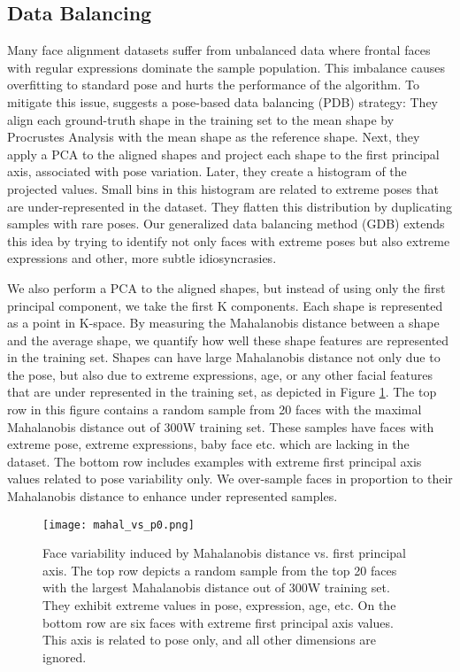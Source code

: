 \documentclass[9pt,twocolumn]{extarticle}
\begin{document}
\subsection{Data Balancing}

Many face alignment datasets suffer from unbalanced data where frontal faces with regular expressions dominate the sample population. This imbalance causes overfitting to standard pose and hurts the performance of the algorithm. To mitigate this issue,  \cite{feng2018wing} suggests a pose-based data balancing (PDB) strategy: They align each ground-truth shape in the training set to the mean shape by Procrustes Analysis with the mean shape as the reference shape. Next, they apply a PCA to the aligned shapes and project each shape to the first principal axis, associated with pose variation. Later, they create a histogram of the projected values. Small bins in this histogram are related to extreme poses that are under-represented in the dataset. They flatten this distribution by duplicating samples with rare poses. Our generalized data balancing method (GDB) extends this idea by trying to identify not only faces with extreme poses but also extreme expressions and other, more subtle idiosyncrasies. 

We also perform a PCA to the aligned shapes, but instead of using only the first principal component, we take the first K components. Each shape is represented as a point in K-space. By measuring the Mahalanobis distance between a shape and the average shape, we quantify how well these shape features are represented in the training set. Shapes can have large Mahalanobis distance not only due to the pose, but also due to extreme expressions, age, or any other facial features that are under represented in the training set, as depicted in Figure \ref{fig:mahal_vs_p0}. The top row in this figure contains a random sample from 20 faces with the maximal Mahalanobis distance out of 300W training set. These samples have faces with extreme pose, extreme expressions, baby face etc. which are lacking in the dataset. The bottom row includes examples with extreme first principal axis values related to pose variability only. We over-sample faces in proportion to their Mahalanobis distance to enhance under represented samples.

\begin{figure}[H]
\texttt{[image: mahal\_vs\_p0.png]}
\caption{Face variability induced by Mahalanobis distance vs. first principal axis. The top row depicts a random sample from the top 20 faces with the largest Mahalanobis distance out of 300W training set. They exhibit extreme values in pose, expression, age, etc. On the bottom row are six faces with extreme first principal axis values. This axis is related to pose only, and all other dimensions are ignored.}
\label{fig:mahal_vs_p0}
\end{figure}
\end{document}
